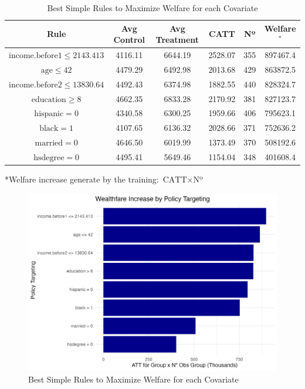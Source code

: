 \documentclass{article}
\begin{document}
\begin{table}[H]
    \centering
    \begin{tabular}{|c|c|c|c|c|c|}
    \hline
    \textbf{Rule} & \textbf{Avg Control} & \textbf{Avg Treatment} & \textbf{CATT} &
    \textbf{Nº} & \textbf{Welfare}$^{*}$ \\
    \hline
    $\text{income.before1} \leq 2143.413$ & 4116.11 & 6644.19 & 2528.07 & 355 & 897467.4 \\
    $\text{age} \leq 42$                  & 4479.29 & 6492.98 & 2013.68 & 429 & 863872.5 \\
    $\text{income.before2} \leq 13830.64$ & 4492.43 & 6374.98 & 1882.55 & 440 & 828324.7 \\
    $\text{education} \geq 8$             & 4662.35 & 6833.28 & 2170.92 & 381 & 827123.7 \\
    $\text{hispanic} = 0$                 & 4340.58 & 6300.25 & 1959.66 & 406 & 795623.1 \\
    $\text{black} = 1$                    & 4107.65 & 6136.32 & 2028.66 & 371 & 752636.2 \\
    $\text{married} = 0$                  & 4646.50 & 6019.99 & 1373.49 & 370 & 508192.6 \\
    $\text{hsdegree} = 0$                 & 4495.41 & 5649.46 & 1154.04 & 348 & 401608.4 \\
    \hline
    \end{tabular}
    \caption{Best Simple Rules to Maximize Welfare for each Covariate}
    \label{tab:earnings_distribution}
\end{table}

*Welfare increase generate by the training: $\text{CATT} \times \text{Nº}$

\begin{figure}[H]
    \centering
    \includegraphics[width=\textwidth]{wealth_increase_by_policy_targeting.png}
    \caption{Best Simple Rules to Maximize Welfare for each Covariate}
    \label{fig:your_image_label}
\end{figure}
\end{document}
